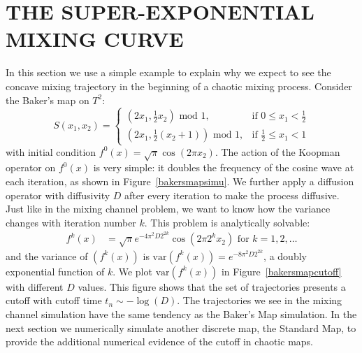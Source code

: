 \documentclass[twocolumn,10pt]{asme2e}
\begin{document}
\section*{THE SUPER-EXPONENTIAL MIXING CURVE}%
In this section we use a simple example to explain why we expect to
see the concave mixing trajectory in the beginning of a chaotic mixing
process. Consider the Baker's map on $T^2$:
\begin{equation*}
     S(x_1,x_2) =
      \begin{cases}
        (2x_1,\frac{1}{2}x_2) \text{ mod } 1,
        & \text{if } 0 \le x_1 < \frac{1}{2} \\
        (2x_1,\frac{1}{2}(x_2+1)) \text{ mod } 1,
        & \text{if } \frac{1}{2} \le x_1 < 1
      \end{cases}
\end{equation*}
with initial condition $f^0(x)= \sqrt{\pi} \cos(2 \pi x_2)$. The
action of the Koopman operator on $f^0(x)$ is very simple: it doubles
the frequency of the cosine wave at each iteration, as shown in
Figure~\ref{bakersmapsimu}. We further apply a diffusion operator with
diffusivity $D$ after every iteration to make the process
diffusive. Just like in the mixing channel problem, we want to know
how the variance changes with iteration number $k$. This problem is
analytically solvable:
\begin{align*}
      f^k(x) &= \sqrt{\pi} e^{-4 \pi^2 D 2 ^{2 k}}\cos(2 \pi 2^k x_2)
      \text{ for } k = 1,2,\ldots
\end{align*}
and the variance of $(f^k(x))$ is $\text{var}(f^k(x)) = e^{-8 \pi^2 D
  2^{2 k}}$, a doubly exponential function of $k$. We plot
$\text{var}(f^k(x))$ in Figure~\ref{bakersmapcutoff} with different
$D$ values. This figure shows that the set of trajectories presents a
cutoff with cutoff time $t_n \sim -\log(D)$. The trajectories we see
in the mixing channel simulation have the same tendency as the Baker's
Map simulation. In the next section we numerically simulate another
discrete map, the Standard Map, to provide the additional numerical
evidence of the cutoff in chaotic maps.
\end{document}
